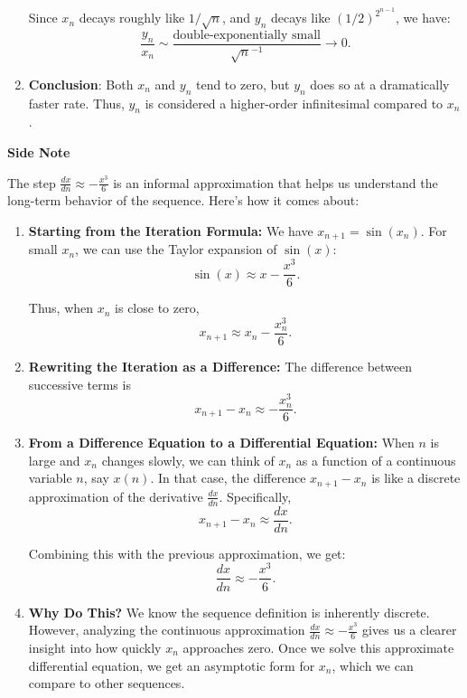 \documentclass[a4paper,12pt]{article}
\begin{document}
\begin{enumerate}
Since \(x_n\) decays roughly like \(1/\sqrt{n}\), and \(y_n\) decays like \((1/2)^{2^{n-1}}\), we have:
\[
\frac{y_n}{x_n} \sim \frac{\text{double-exponentially small}}{\sqrt{n}^{-1}} \to 0.
\]

\item 
\textbf{Conclusion}:\newline
Both \(x_n\) and \(y_n\) tend to zero, but \(y_n\) does so at a dramatically faster rate. Thus, \(y_n\) is considered a higher-order infinitesimal compared to \(x_n\).

\end{enumerate}

\textbf{Side Note}

The step \(\frac{dx}{dn} \approx -\frac{x^3}{6}\) is an informal approximation that helps us understand the long-term behavior of the sequence. Here's how it comes about:
\begin{enumerate}
\item 
\textbf{Starting from the Iteration Formula:}\newline
We have \( x_{n+1} = \sin(x_n) \). For small \(x_n\), we can use the Taylor expansion of \(\sin(x)\):
\[
\sin(x) \approx x - \frac{x^3}{6}.
\]

Thus, when \(x_n\) is close to zero,
\[
x_{n+1} \approx x_n - \frac{x_n^3}{6}.
\]

\item 
\textbf{Rewriting the Iteration as a Difference:}\newline
The difference between successive terms is
\[
x_{n+1} - x_n \approx -\frac{x_n^3}{6}.
\]

\item 
\textbf{From a Difference Equation to a Differential Equation:}\newline
When \(n\) is large and \(x_n\) changes slowly, we can think of \(x_n\) as a function of a continuous variable \(n\), say \(x(n)\). In that case, the difference \(x_{n+1} - x_n\) is like a discrete approximation of the derivative \(\frac{dx}{dn}\). Specifically,
\[
x_{n+1} - x_n \approx \frac{dx}{dn}.
\]

Combining this with the previous approximation, we get:
\[
\frac{dx}{dn} \approx -\frac{x^3}{6}.
\]

\item 
\textbf{Why Do This?}\newline
We know the sequence definition is inherently discrete. However, analyzing the continuous approximation \(\frac{dx}{dn} \approx -\frac{x^3}{6}\) gives us a clearer insight into how quickly \(x_n\) approaches zero. Once we solve this approximate differential equation, we get an asymptotic form for \(x_n\), which we can compare to other sequences.

\end{enumerate}
\end{document}
